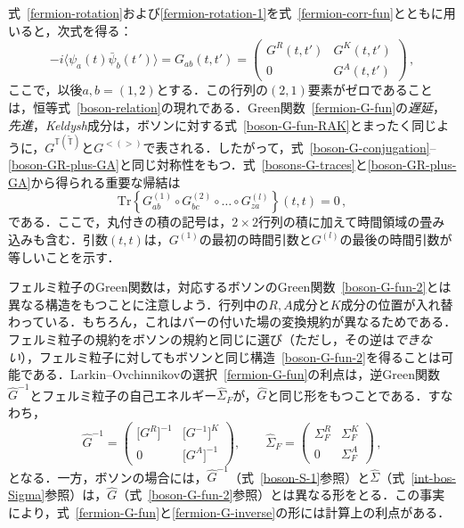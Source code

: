 \documentclass[a4paper,11pt]{ltjsarticle}
\def\Tr{\mathrm{Tr}}
\begin{document}
式~\eqref{fermion-rotation}および\eqref{fermion-rotation-1}を式~\eqref{fermion-corr-fun}とともに用いると，次式を得る：
\begin{equation}\label{fermion-G-fun}
-i\big\langle\psi_{a}(t)\bar{\psi}_{b}(t\,')\big\rangle=
G_{ab}(t,t') = \left(\begin{array}{cc}
G^R(t,t') & G^{K}(t,t') \\
0                & G^{A}(t,t')
\end{array}\right)\, ,
\end{equation}
ここで，以後$a,b  = (1,2)$とする．この行列の$(2,1)$要素がゼロであることは，恒等式~\eqref{boson-relation}の現れである．Green関数~\eqref{fermion-G-fun}の{\em 遅延}，{\em 先進}，{\em Keldysh}成分は，ボソンに対する式~\eqref{boson-G-fun-RAK}とまったく同じように，$G^{\mathbb{T}(\widetilde{\mathbb{T}})}$と$G^{<(>)}$で表される．したがって，式~\eqref{boson-G-conjugation}--\eqref{boson-GR-plus-GA}と同じ対称性をもつ．式~\eqref{bosons-G-traces}と\eqref{boson-GR-plus-GA}から得られる重要な帰結は
\begin{equation}\label{fermion-traces}
\Tr\left\{G_{ab}^{(1)}\circ G_{bc}^{(2)}\circ\ldots\circ G_{za}^{(l)}
\right\}(t,t) =0\, ,
\end{equation}
である．ここで，丸付きの積の記号は，$2\times 2$行列の積に加えて時間領域の畳み込みも含む．引数$(t,t)$は，$G^{(1)}$の最初の時間引数と$G^{(l)}$の最後の時間引数が等しいことを示す．



フェルミ粒子のGreen関数は，対応するボソンのGreen関数~\eqref{boson-G-fun-2}とは異なる構造をもつことに注意しよう．行列中の$R,A$成分と$K$成分の位置が入れ替わっている．もちろん，これはバーの付いた場の変換規約が異なるためである．フェルミ粒子の規約をボソンの規約と同じに選び（ただし，その逆は{\em できない}），フェルミ粒子に対してもボソンと同じ構造~\eqref{boson-G-fun-2}を得ることは可能である．Larkin--Ovchinnikovの選択~\eqref{fermion-G-fun}の利点は，逆Green関数$\hat{G}^{-1}$とフェルミ粒子の自己エネルギー$\hat{\Sigma}_F$が，$\hat{G}$と同じ形をもつことである．すなわち，
\begin{equation}\label{fermion-G-inverse}
\hat{G}^{-1}=\left(\begin{array}{cc}
\big[G^{R}\big]^{-1} & \big[G^{-1}\big]^{K} \\
0                & \big[G^{A}\big]^{-1}
\end{array}\right),\qquad
\hat{\Sigma}_F = \left(\begin{array}{cc}
\Sigma_F^R       &  \Sigma_F^{K} \\
0                &  \Sigma_F^{A}
\end{array}\right)\, ,
\end{equation}
となる．一方，ボソンの場合には，$\hat{G}^{-1}$（式~\eqref{boson-S-1}参照）と$\hat{\Sigma}$（式~\eqref{int-bos-Sigma}参照）は，$\hat{G}$（式~\eqref{boson-G-fun-2}参照）とは異なる形をとる．この事実により，式~\eqref{fermion-G-fun}と\eqref{fermion-G-inverse}の形には計算上の利点がある．
\end{document}
